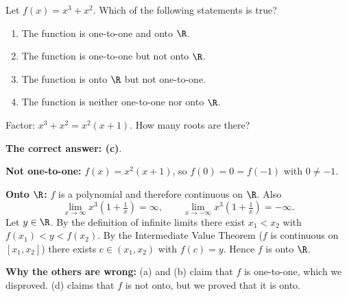 
\begin{question}
Let $f(x)=x^3+x^2$. Which of the following statements is true?
\begin{enumerate}
  \item The function is one-to-one and onto $\R$.
  \item The function is one-to-one but not onto $\R$.
  \item The function is onto $\R$ but not one-to-one.
  \item The function is neither one-to-one nor onto $\R$.
\end{enumerate}
\end{question}

\begin{hint}
Factor: $x^3+x^2=x^2(x+1)$. How many roots are there?
\end{hint}

\begin{solution}
\textbf{The correct answer: (c)}.

\textbf{Not one-to-one:} $f(x)=x^2(x+1)$, so $f(0)=0=f(-1)$ with $0\neq-1$.

\textbf{Onto $\R$:} $f$ is a polynomial and therefore continuous on $\R$. Also
\[
\lim_{x\to\infty}x^3\left(1+\tfrac1x\right)=\infty,\qquad \lim_{x\to-\infty}x^3\left(1+\tfrac1x\right)=-\infty .
\]
Let $y\in\R$. By the definition of infinite limits there exist $x_1<x_2$ with $f(x_1)<y<f(x_2)$. By the Intermediate Value Theorem ($f$ is continuous on $[x_1,x_2]$) there exists $c\in(x_1,x_2)$ with $f(c)=y$. Hence $f$ is onto $\R$.

\textbf{Why the others are wrong:} (a) and (b) claim that $f$ is one-to-one, which we disproved. (d) claims that $f$ is not onto, but we proved that it is onto.
\end{solution}
